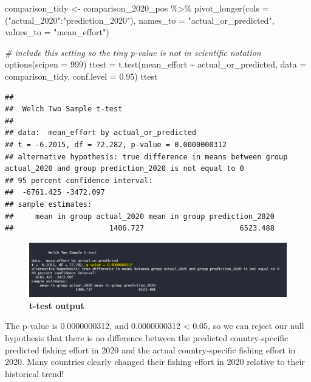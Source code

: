 \documentclass[
]{article}
\newenvironment{Shaded}{\begin{snugshade}}{\end{snugshade}}
\newcommand{\AttributeTok}[1]{\textcolor[rgb]{0.77,0.63,0.00}{#1}}
\newcommand{\CommentTok}[1]{\textcolor[rgb]{0.56,0.35,0.01}{\textit{#1}}}
\newcommand{\DecValTok}[1]{\textcolor[rgb]{0.00,0.00,0.81}{#1}}
\newcommand{\FloatTok}[1]{\textcolor[rgb]{0.00,0.00,0.81}{#1}}
\newcommand{\FunctionTok}[1]{\textcolor[rgb]{0.00,0.00,0.00}{#1}}
\newcommand{\NormalTok}[1]{#1}
\newcommand{\OtherTok}[1]{\textcolor[rgb]{0.56,0.35,0.01}{#1}}
\newcommand{\SpecialCharTok}[1]{\textcolor[rgb]{0.00,0.00,0.00}{#1}}
\newcommand{\StringTok}[1]{\textcolor[rgb]{0.31,0.60,0.02}{#1}}
\begin{document}
\begin{Shaded}
\begin{Highlighting}[]
\NormalTok{comparison\_tidy }\OtherTok{\textless{}{-}}\NormalTok{ comparison\_2020\_pos }\SpecialCharTok{\%\textgreater{}\%} 
  \FunctionTok{pivot\_longer}\NormalTok{(}\AttributeTok{cols =}\NormalTok{ (}\StringTok{"actual\_2020"}\SpecialCharTok{:}\StringTok{"prediction\_2020"}\NormalTok{),}
               \AttributeTok{names\_to =} \StringTok{"actual\_or\_predicted"}\NormalTok{,}
               \AttributeTok{values\_to =} \StringTok{"mean\_effort"}\NormalTok{)}

\CommentTok{\# include this setting so the tiny p{-}value is not in scientific notation}
\FunctionTok{options}\NormalTok{(}\AttributeTok{scipen =} \DecValTok{999}\NormalTok{)}
\NormalTok{ttest }\OtherTok{=} \FunctionTok{t.test}\NormalTok{(mean\_effort }\SpecialCharTok{\textasciitilde{}}\NormalTok{ actual\_or\_predicted, }\AttributeTok{data =}\NormalTok{ comparison\_tidy, }\AttributeTok{conf.level =} \FloatTok{0.95}\NormalTok{)}
\NormalTok{ttest}
\end{Highlighting}
\end{Shaded}

\begin{verbatim}
## 
##  Welch Two Sample t-test
## 
## data:  mean_effort by actual_or_predicted
## t = -6.2015, df = 72.282, p-value = 0.0000000312
## alternative hypothesis: true difference in means between group actual_2020 and group prediction_2020 is not equal to 0
## 95 percent confidence interval:
##  -6761.425 -3472.097
## sample estimates:
##     mean in group actual_2020 mean in group prediction_2020 
##                      1406.727                      6523.488
\end{verbatim}

\begin{figure}
\centering
\includegraphics{pictures/ttest_highlighted.png}
\caption{\textbf{t-test output}}
\end{figure}

The p-value is 0.0000000312, and 0.0000000312 \textless{} 0.05, so we
can reject our null hypothesis that there is no difference between the
predicted country-specific predicted fishing effort in 2020 and the
actual country-specific fishing effort in 2020. Many countries clearly
changed their fishing effort in 2020 relative to their historical trend!
\end{document}
